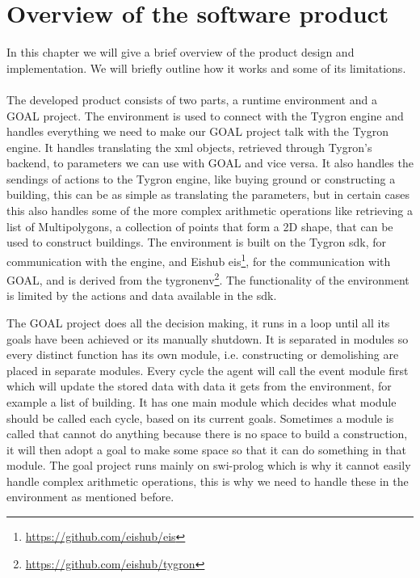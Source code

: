 \chapter{Overview of the software product}\label{sec:overview}
In this chapter we will give a brief overview of the product design and implementation. We will briefly outline how it works and some of its limitations.
\\
\\
The developed product consists of two parts, a runtime environment and a GOAL project.
The environment is used to connect with the Tygron engine and handles everything we need to make our GOAL project talk with the Tygron engine.
It handles translating the xml objects, retrieved through Tygron's backend, to parameters we can use with GOAL and vice versa.
It also handles the sendings of actions to the Tygron engine, like buying ground or constructing a building, this can be as simple as translating the parameters, but in certain cases this also handles some of the more complex arithmetic operations like retrieving a list of Multipolygons, a collection of points that form a 2D shape, that can be used to construct buildings.
The environment is built on the Tygron sdk, for communication with the engine, and Eishub eis\footnote{\url{https://github.com/eishub/eis}}, for the communication with GOAL, and is derived from the tygronenv\footnote{\url{https://github.com/eishub/tygron}}.
The functionality of the environment is limited by the actions and data available in the sdk.

The GOAL project does all the decision making, it runs in a loop until all its goals have been achieved or its manually shutdown.
It is separated in modules so every distinct function has its own module, i.e. constructing or demolishing are placed in separate modules.
Every cycle the agent will call the event module first which will update the stored data with data it gets from the environment, for example a list of building.
It has one main module which decides what module should be called each cycle, based on its current goals.
Sometimes a module is called that cannot do anything because there is no space to build a construction, it will then adopt a goal to make some space so that it can do something in that module.
The goal project runs mainly on swi-prolog which is why it cannot easily handle complex arithmetic operations, this is why we need to handle these in the environment as mentioned before.
